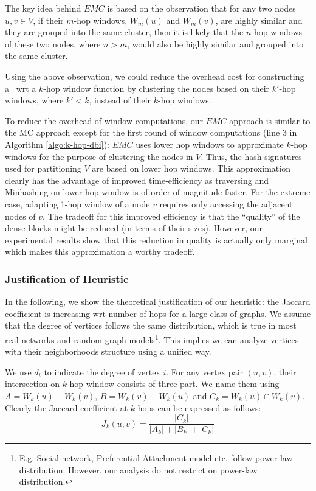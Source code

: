 The key idea behind $EMC$ is based on the observation that for any two nodes $u, v \in V$,
if their $m$-hop windows, $W_m(u)$ and $W_m(v)$, are highly similar 
and they are grouped into the same cluster, 
then it is likely that the $n$-hop windows of these two nodes, where $n > m$,
would also be highly similar and grouped into the same cluster.

Using the above observation, we could reduce the overhead cost for constructing a \DBIndex\ wrt a $k$-hop window 
function by clustering the nodes based on their $k'$-hop windows, where $k' < k$, instead of their $k$-hop windows.

To reduce the overhead of window computations,
our $EMC$ approach is similar to the MC approach except   
for the first round of window computations
(line 3 in Algorithm \ref{algo:k-hop-dbi}):
$EMC$ uses lower hop windows to approximate $k$-hop windows for the purpose of clustering the nodes in $V$.
Thus, the hash signatures used for partitioning $V$ are based on lower hop windows.
This approximation clearly has the advantage of improved time-efficiency as traversing and Minhashing on lower hop window is of
order of magnitude faster. For the extreme case, adapting 1-hop window of a node $v$ requires only accessing the adjacent nodes of $v$. 
The tradeoff for this improved efficiency is that the ``quality'' of the dense blocks might be reduced (in terms of their sizes).
However, our experimental results show that this reduction in quality is actually only marginal which makes this approximation a worthy tradeoff.


\subsubsection {Justification of Heuristic}
In the following, we show the theoretical justification of our heuristic: the Jaccard coefficient
is increasing wrt number of hops for a large class of graphs. We 
assume that the degree of vertices follows the same distribution, which is true in most
real-networks and random graph models\footnote{E.g. Social network, Preferential Attachment model etc. follow
power-law distribution. However, our analysis do not restrict on power-law distribution.}.  
This implies we can analyze vertices 
with their neighborhoods structure using a unified way. 

We use $d_i$ to indicate the degree of vertex $i$. For any vertex pair $(u,v)$, their 
intersection on $k$-hop window consists of three part. We name them using $A=W_k(u)-W_k(v)$, 
$B=W_k(v)-W_k(u)$ and $C_k = W_k(u) \cap W_k(v)$. Clearly the Jaccard coefficient at $k$-hops
can be expressed as follows:
\begin{equation}
	J_k(u,v) = \frac{|C_k|}{|A_k| + |B_k| + |C_k|}
\end{equation}

